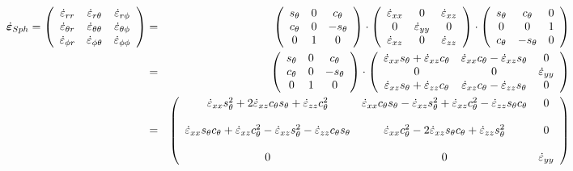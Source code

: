 \begin{eqnarray}
\dot{\bm \varepsilon}_{\tiny Sph}=
\left(
\begin{array}{ccc}
\dot\varepsilon_{rr}       & \dot\varepsilon_{r\theta}      & \dot\varepsilon_{r\phi} \\
\dot\varepsilon_{\theta r} & \dot\varepsilon_{\theta\theta} & \dot\varepsilon_{\theta\phi} \\
\dot\varepsilon_{\phi r}   & \dot\varepsilon_{\phi \theta}  & \dot\varepsilon_{\phi\phi}
\end{array}
\right)
&=&
\left(
\begin{array}{ccc}
s_\theta  & 0 & c_\theta \\
c_\theta  & 0 & -s_\theta \\
0 & 1 & 0 
\end{array}
\right)
\cdot
\left(
\begin{array}{ccc}
\dot\varepsilon_{xx} & 0 & \dot{\varepsilon}_{xz} \\
0 & \dot{\varepsilon}_{yy}  & 0 \\
\dot{\varepsilon}_{xz} & 0 & \dot\varepsilon_{zz}
\end{array}
\right)
\cdot
\left(
\begin{array}{ccc}
s_\theta & c_\theta & 0 \\
0 & 0 & 1 \\
c_\theta & -s_\theta & 0
\end{array}
\right)  \nonumber\\
&=&
\left(
\begin{array}{ccc}
s_\theta  & 0 & c_\theta \\
c_\theta  & 0 & -s_\theta \\
0 & 1 & 0 
\end{array}
\right)
\cdot
\left(
\begin{array}{ccc}
\dot\varepsilon_{xx} s_\theta + 
\dot\varepsilon_{xz} c_\theta  & 
\dot\varepsilon_{xx} c_\theta - 
\dot\varepsilon_{xz} s_\theta  &
0 \\
0 & 0 & \dot{\varepsilon}_{yy}  
\\
\dot\varepsilon_{xz} s_\theta + 
\dot\varepsilon_{zz} c_\theta  &
\dot\varepsilon_{xz} c_\theta - 
\dot\varepsilon_{zz} s_\theta  &
0 
\end{array}
\right)  \nonumber\\
&=&
\left(
\begin{array}{ccc}
\dot\varepsilon_{xx} s_\theta^2 + 
2 \dot\varepsilon_{xz} c_\theta  s_\theta +
\dot\varepsilon_{zz} c_\theta ^2  
& 
\dot\varepsilon_{xx} c_\theta s_\theta - 
\dot\varepsilon_{xz} s_\theta^2  +
\dot\varepsilon_{xz} c_\theta^2 - 
\dot\varepsilon_{zz} s_\theta c_\theta 
& 0 \\ \\
\dot\varepsilon_{xx} s_\theta c_\theta+ 
\dot\varepsilon_{xz} c_\theta^2  -
\dot\varepsilon_{xz} s_\theta^2 -
\dot\varepsilon_{zz} c_\theta s_\theta 
&
\dot\varepsilon_{xx} c_\theta^2 - 
2\dot\varepsilon_{xz} s_\theta c_\theta +
\dot\varepsilon_{zz} s_\theta^2  
& 0 
\\ \\
0 & 0 & \dot{\varepsilon}_{yy} 
\end{array}
\right)  \nonumber
\end{eqnarray}
